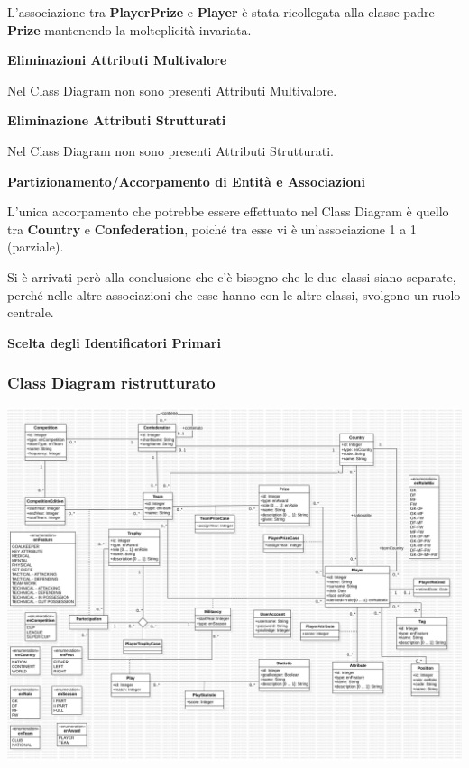 L'associazione tra \textbf{PlayerPrize} e 
\textbf{Player} è stata ricollegata alla classe 
padre \textbf{Prize} mantenendo la molteplicità invariata.

\newpage
\textbf{\large Eliminazioni Attributi Multivalore}
\bigskip

Nel Class Diagram non sono presenti Attributi Multivalore.

\bigskip
\textbf{\large Eliminazione Attributi Strutturati}
\bigskip

Nel Class Diagram non sono presenti Attributi Strutturati.

\bigskip
\textbf{\large Partizionamento/Accorpamento di Entità
		e Associazioni}
\bigskip

L'unica accorpamento che potrebbe essere effettuato nel Class 
Diagram è quello tra \textbf{Country} e 
\textbf{Confederation}, poiché tra esse vi è un'associazione 
1 a 1 (parziale).

Si è arrivati però alla conclusione che c'è bisogno che le 
due classi siano separate, perché nelle altre associazioni 
che esse hanno con le altre classi, svolgono un ruolo 
centrale.

\newpage
\bigskip
\textbf{\large Scelta degli Identificatori Primari}
\bigskip

\newpage
\subsubsection{\Large Class Diagram ristrutturato}
\includegraphics[width=\textwidth]{res/class_diagram_ristr}
\newpage

